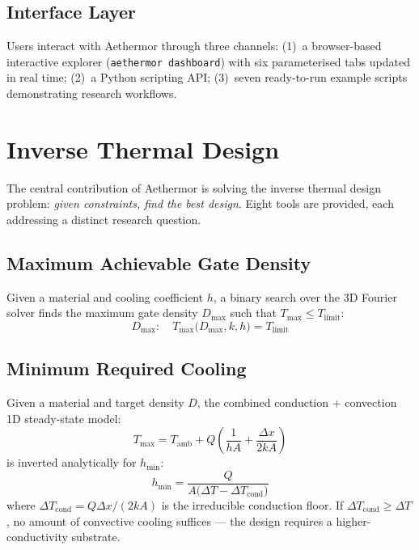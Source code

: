 \documentclass[11pt,twocolumn]{article}
\begin{document}
\subsection{Interface Layer}

Users interact with Aethermor through three channels: (1)~a
browser-based interactive explorer (\texttt{aethermor dashboard}) with six
parameterised tabs updated in real time; (2)~a Python scripting API;
(3)~seven ready-to-run example scripts demonstrating research workflows.


\section{Inverse Thermal Design}
\label{sec:inverse}

The central contribution of Aethermor is solving the inverse thermal
design problem: \emph{given constraints, find the best design}. Eight
tools are provided, each addressing a distinct research question.

\subsection{Maximum Achievable Gate Density}

Given a material and cooling coefficient $h$, a binary search over the
3D Fourier solver finds the maximum gate density $D_{\max}$ such that
$T_{\max} \leq T_{\mathrm{limit}}$:
\begin{equation}
  D_{\max}: \quad T_{\max}\bigl(D_{\max}, k, h\bigr) = T_{\mathrm{limit}}
  \label{eq:dmax}
\end{equation}

\subsection{Minimum Required Cooling}

Given a material and target density $D$, the combined conduction +
convection 1D steady-state model:
\begin{equation}
  T_{\max} = T_{\mathrm{amb}} + Q \left( \frac{1}{h A} + \frac{\Delta x}{2 k A} \right)
  \label{eq:tmax1d}
\end{equation}
is inverted analytically for $h_{\min}$:
\begin{equation}
  h_{\min} = \frac{Q}{A \bigl( \Delta T - \Delta T_{\mathrm{cond}} \bigr)}
  \label{eq:hmin}
\end{equation}
where $\Delta T_{\mathrm{cond}} = Q \Delta x / (2kA)$ is the
irreducible conduction floor. If $\Delta T_{\mathrm{cond}} \geq
\Delta T$, no amount of convective cooling suffices --- the design
requires a higher-conductivity substrate.
\end{document}
